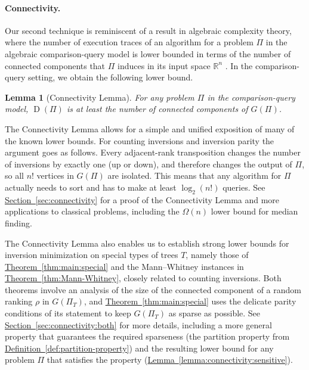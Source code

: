 \documentclass[11pt]{article}
\numberwithin{equation}{section}
\newtheorem{lemma}[theorem]{Lemma}
\theoremstyle{definition}
\theoremstyle{plain}
\newcommand{\R}{\mathbb R}
\newcommand{\expref}[2]{\hyperref[#2]{#1~\ref{#2}}}
\newcommand{\ranking}{\rho}
\DeclareMathOperator{\traces}{D}
\begin{document}
\paragraph{Connectivity.} Our second technique is reminiscent of a result in algebraic complexity theory, where the number of execution traces of an algorithm for a problem $\Pi$ in the algebraic comparison-query model is lower bounded in terms of the number of connected components that $\Pi$ induces in its input space $\R^n$ \cite{Ben-Or1983}. In the comparison-query setting, we obtain the following lower bound.

\begin{lemma}[Connectivity Lemma]\label{lemma:connectivity} For any problem $\Pi$ in the comparison-query model, $\traces(\Pi)$ is at least the number of connected components of $G(\Pi)$.
\end{lemma}

The Connectivity Lemma allows for a simple and unified exposition of many of the known lower bounds. For counting inversions and inversion parity the argument goes as follows. Every adjacent-rank transposition changes the number of inversions by exactly one (up or down), and therefore changes the output of $\Pi$, so all $n!$ vertices in $G(\Pi)$ are isolated. This means that any algorithm for $\Pi$ actually needs to sort and has to make at least $\log_2(n!)$ queries. See \expref{Section}{sec:connectivity} for a proof of the Connectivity Lemma and more applications to classical problems, including the $\Omega(n)$ lower bound for median finding.

The Connectivity Lemma also enables us to establish strong lower bounds for inversion minimization on special types of trees $T$, namely those of \expref{Theorem}{thm:main:special} and the Mann--Whitney instances in \expref{Theorem}{thm:Mann-Whitney}, closely related to counting inversions. Both theorems involve an analysis of the size of the connected component of a random ranking $\ranking$ in $G(\Pi_T)$, and \expref{Theorem}{thm:main:special} uses the delicate parity conditions of its statement to keep $G(\Pi_T)$ as sparse as possible. See \expref{Section}{sec:connectivity:both} for more details, including a more general property that guarantees the required sparseness (the partition property from \expref{Definition}{def:partition-property}) and the resulting lower bound for any 
%
problem $\Pi$ that satisfies the property (\expref{Lemma}{lemma:connectivity:sensitive}). 
\end{document}
